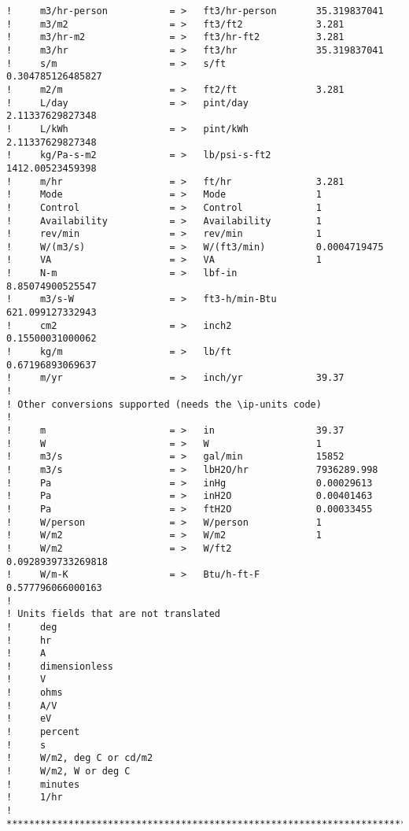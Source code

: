 \begin{lstlisting}
!     m3/hr-person           = >   ft3/hr-person       35.319837041
!     m3/m2                  = >   ft3/ft2             3.281
!     m3/hr-m2               = >   ft3/hr-ft2          3.281
!     m3/hr                  = >   ft3/hr              35.319837041
!     s/m                    = >   s/ft                0.304785126485827
!     m2/m                   = >   ft2/ft              3.281
!     L/day                  = >   pint/day            2.11337629827348
!     L/kWh                  = >   pint/kWh            2.11337629827348
!     kg/Pa-s-m2             = >   lb/psi-s-ft2        1412.00523459398
!     m/hr                   = >   ft/hr               3.281
!     Mode                   = >   Mode                1
!     Control                = >   Control             1
!     Availability           = >   Availability        1
!     rev/min                = >   rev/min             1
!     W/(m3/s)               = >   W/(ft3/min)         0.0004719475
!     VA                     = >   VA                  1
!     N-m                    = >   lbf-in              8.85074900525547
!     m3/s-W                 = >   ft3-h/min-Btu       621.099127332943
!     cm2                    = >   inch2               0.15500031000062
!     kg/m                   = >   lb/ft               0.67196893069637
!     m/yr                   = >   inch/yr             39.37
!
! Other conversions supported (needs the \ip-units code)
!
!     m                      = >   in                  39.37
!     W                      = >   W                   1
!     m3/s                   = >   gal/min             15852
!     m3/s                   = >   lbH2O/hr            7936289.998
!     Pa                     = >   inHg                0.00029613
!     Pa                     = >   inH2O               0.00401463
!     Pa                     = >   ftH2O               0.00033455
!     W/person               = >   W/person            1
!     W/m2                   = >   W/m2                1
!     W/m2                   = >   W/ft2               0.0928939733269818
!     W/m-K                  = >   Btu/h-ft-F          0.577796066000163
!
! Units fields that are not translated
!     deg
!     hr
!     A
!     dimensionless
!     V
!     ohms
!     A/V
!     eV
!     percent
!     s
!     W/m2, deg C or cd/m2
!     W/m2, W or deg C
!     minutes
!     1/hr
! **************************************************************************
\end{lstlisting}
